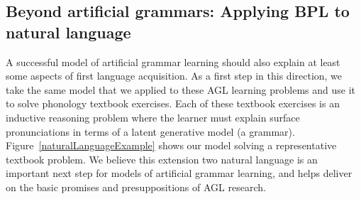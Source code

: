 \documentclass{article}
\begin{document}
\subsection{Beyond artificial grammars: Applying BPL to natural language}

A successful model of artificial grammar learning should also explain
at least some aspects of first language acquisition.  As a first step
in this direction, we take the same model that we applied to these AGL
learning problems and use it to solve phonology textbook exercises.
Each of these textbook exercises is an inductive reasoning problem
where the learner must explain surface pronunciations in terms of a
latent generative model (a grammar).
Figure~\ref{naturalLanguageExample} shows our model solving a
representative textbook problem.  We believe this extension two
natural language is an important next step for models of artificial
grammar learning,
and helps deliver on the basic promises and presuppositions of AGL research.
\end{document}

